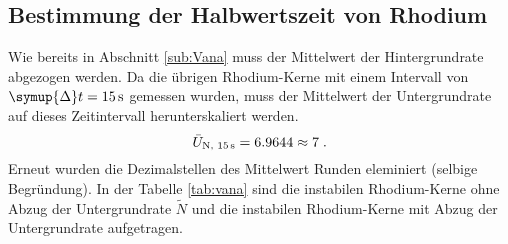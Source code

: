 \subsection{Bestimmung der Halbwertszeit von Rhodium}
Wie bereits in Abschnitt \ref{sub:Vana} muss der Mittelwert der Hintergrundrate abgezogen werden.
Da die übrigen Rhodium-Kerne mit einem Intervall von $\symup{\Delta} t = \SI{15}{\second}$ gemessen wurden, muss der Mittelwert der Untergrundrate
auf dieses Zeitintervall herunterskaliert werden.
\begin{equation*}
    \bar{U}_\text{N, \SI{15}{\second}} = 6.9644 \approx 7 \; \text{.}
\end{equation*}
Erneut wurden die  Dezimalstellen des Mittelwert Runden eleminiert (selbige Begründung).
In der Tabelle \ref{tab:vana} sind die instabilen Rhodium-Kerne ohne Abzug der Untergrundrate $\tilde{N}$ und die instabilen Rhodium-Kerne mit Abzug 
der Untergrundrate aufgetragen.
